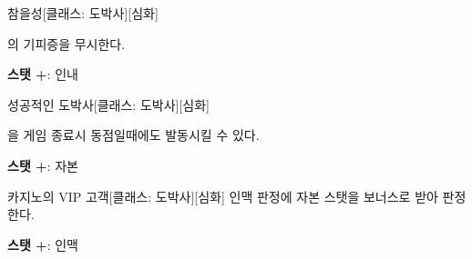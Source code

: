 \documentclass{report}
\begin{document}
	\begin{story}{참을성}{[클래스: 도박사][심화]}
		
		의 기피증을 무시한다.
		
		\smallskip
		
		\textbf{스탯 +}: 인내
		
	\end{story}
	
	\begin{story}{성공적인 도박사}{[클래스: 도박사][심화]}
		
		을 게임 종료시 동점일때에도 발동시킬 수 있다.
		
		\smallskip
		
		\textbf{스탯 +}: 자본
		
	\end{story}
	
	\begin{story}{카지노의 VIP 고객}{[클래스: 도박사][심화]}
		인맥 판정에 자본 스탯을 보너스로 받아 판정한다.
		
		\smallskip
		
		\textbf{스탯 +}: 인맥
		
	\end{story}
\end{document}
